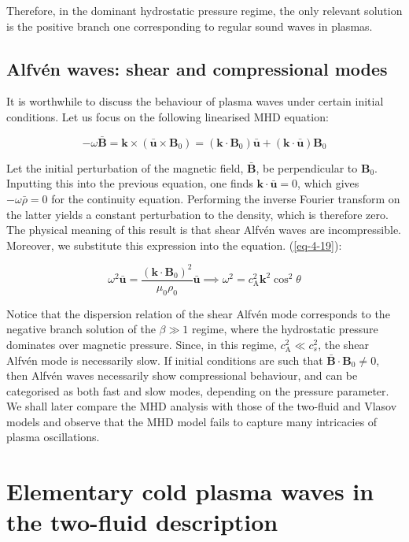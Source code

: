 Therefore, in the dominant hydrostatic pressure regime, the only relevant solution is the positive branch one corresponding to regular sound waves in plasmas.

\subsection{Alfvén waves: shear and compressional modes}

It is worthwhile to discuss the behaviour of plasma waves under certain initial conditions. Let us focus on the following linearised MHD equation:

\begin{equation}
    -\omega\bar{\mathbf{B}}=\mathbf{k}\times(\bar{\mathbf{u}}\times\mathbf{B}_0)=(\mathbf{k}\cdot\mathbf{B}_0)\bar{\mathbf{u}}+(\mathbf{k}\cdot\bar{\mathbf{u}})\mathbf{B}_0
\end{equation}

Let the initial perturbation of the magnetic field, $\bar{\mathbf{B}}$, be perpendicular to $\mathbf{B}_0$. Inputting this into the previous equation, one finds $\mathbf{k}\cdot\bar{\mathbf{u}}=0$, which gives $-\omega\bar{\rho}=0$ for the continuity equation. Performing the inverse Fourier transform on the latter yields a constant perturbation to the density, which is therefore zero. The physical meaning of this result is that shear Alfvén waves are incompressible. Moreover, we substitute this expression into the equation. (\ref{eq-4-19}):

\begin{equation}
    \omega^2\bar{\mathbf{u}}=\frac{(\mathbf{k}\cdot\mathbf{B}_0)^2}{\mu_0\rho_0}\bar{\mathbf{u}}\implies\omega^2=c_\text{A}^2\mathbf{k}^2\cos^2{\theta}
\end{equation}

Notice that the dispersion relation of the shear Alfvén mode corresponds to the negative branch solution of the $\beta\gg1$ regime, where the hydrostatic pressure dominates over magnetic pressure. Since, in this regime, $c_\text{A}^2\ll c_s^2$, the shear Alfvén mode is necessarily slow. If initial conditions are such that $\bar{\mathbf{B}}\cdot\mathbf{B}_0\neq0$, then Alfvén waves necessarily show compressional behaviour, and can be categorised as both fast and slow modes, depending on the pressure parameter. We shall later compare the MHD analysis with those of the two-fluid and Vlasov models and observe that the MHD model fails to capture many intricacies of plasma oscillations.

\section{Elementary cold plasma waves in the two-fluid description}


